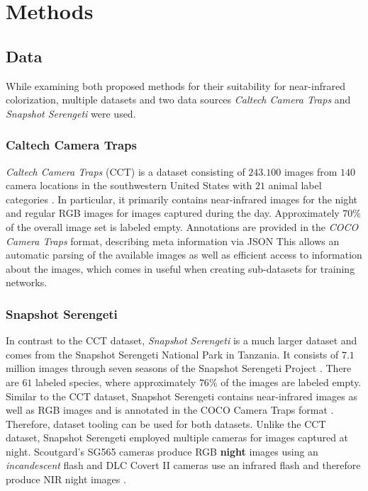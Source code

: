 \chapter{Methods}

\section{Data}
While examining both proposed methods for their suitability for near-infrared colorization, multiple datasets
and two data sources \textit{Caltech Camera Traps} \cite{caltech} and \textit{Snapshot Serengeti} \cite{serengeti} were used.

\subsection{Caltech Camera Traps}
\textit{Caltech Camera Traps} (CCT) is a dataset consisting of $243.100$ images from $140$ camera locations
in the southwestern United States with $21$ animal label categories \cite{caltech}.
In particular, it primarily contains near-infrared images for the night and regular RGB images for images captured during the day.
Approximately $70 \%$ of the overall image set is labeled empty.
Annotations are provided in the \textit{COCO Camera Traps} format, describing meta information via JSON \cite{caltech}
This allows an automatic parsing of the available images as well as efficient access to information about
the images, which comes in useful when creating sub-datasets for training networks.

\subsection{Snapshot Serengeti}
In contrast to the CCT dataset, \textit{Snapshot Serengeti} is a much larger dataset and comes from the Snapshot Serengeti National Park in Tanzania.
It consists of $7.1$ million images through seven seasons of the Snapshot Serengeti Project \cite{serengeti}.
There are $61$ labeled species, where approximately $76\%$ of the images are labeled empty.
Similar to the CCT dataset, Snapshot Serengeti contains near-infrared images as well as RGB images and
is annotated in the COCO Camera Traps format \cite{serengeti}. Therefore, dataset tooling can be used for both datasets.
Unlike the CCT dataset, Snapshot Serengeti employed multiple cameras for images captured at night.
Scoutgard's SG565 cameras produce RGB \textbf{night} images using an \textit{incandescent} flash and DLC Covert II cameras use an infrared flash and therefore produce NIR night images \cite{serengeti}.

